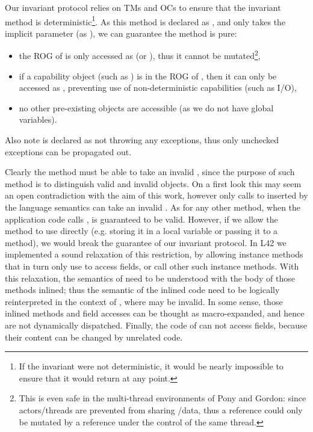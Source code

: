 
Our invariant protocol relies on TMs and OCs to ensure that the invariant method is deterministic\footnote{If the invariant were not deterministic, it would be nearly impossible to ensure that it would return \Q@true@ at any point.}.
As this method is declared as \Q@read@, and only takes the implicit parameter \Q@this@ (as \Q@read@), we can guarantee the method is pure:
\begin{itemize}
\item the ROG of \Q@this@ is only accessed as \Q@read@ (or \Q@imm@), thus it cannot be mutated\footnote{
This is even safe in the multi-thread environments of Pony and Gordon: since actors/threads are prevented from sharing \Q@mut@/\Q@capsule@ data, thus a \Q@read@ reference could only be mutated by a \Q@mut@ reference under the control of the same thread.},
\item if a capability object (such as \Q@System@) is in the ROG of \Q@this@, then it can only be accessed as \Q@read@, preventing use of non-deterministic capabilities (such as I/O),
\item no other pre-existing objects are accessible (as we do not have global variables).
\end{itemize}

\noindent Also note \Q@invariant@ is declared as not throwing any exceptions,
	thus only unchecked exceptions can be propagated out.


Clearly the \Q@invariant@ method must be able to take an invalid \Q@this@, since the purpose of such method is to distinguish valid and invalid objects.
On a first look this may seem an open contradiction
with the aim of this work, however only calls to \Q@invariant@ inserted by the language semantics can take an invalid \Q@this@. As for any other method, when the application code calls \Q@invariant@,
\Q@this@ is guaranteed to be valid.
However, if we allow the method to use \Q@this@ directly (e.g. storing it in a local variable or passing it to a method), we would break the guarantee of our invariant protocol.
In L42 we implemented a sound relaxation of this restriction, by allowing instance methods that in turn only use \Q@this@ to access fields, or call other such instance methods. With this relaxation, the semantics of \Q@invariant@ need to be understood with the body of those methods inlined; thus the semantic of the inlined code need to be logically reinterpreted in the context of \Q@invariant@, where \Q@this@ may be invalid.
In some sense, those inlined methods and field accesses can be thought as macro-expanded, and hence are not dynamically dispatched.
Finally,
the code of \Q@invariant@ can not access \Q@mut@ fields, because their content can be changed by unrelated code.

